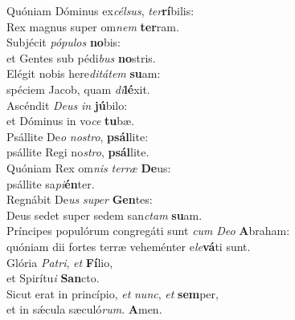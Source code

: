 \evenverse Quóniam Dóminus ex\textit{cél}\textit{sus}, \textit{ter}\textbf{rí}bilis:~\*\\
\evenverse Rex magnus super om\textit{nem} \textbf{ter}ram.\\
\oddverse Subjécit \textit{pó}\textit{pu}\textit{los} \textbf{no}bis:~\*\\
\oddverse et Gentes sub pédi\textit{bus} \textbf{no}stris.\\
\evenverse Elégit nobis here\textit{di}\textit{tá}\textit{tem} \textbf{su}am:~\*\\
\evenverse spéciem Jacob, quam \textit{di}\textbf{lé}xit.\\
\oddverse Ascéndit \textit{De}\textit{us} \textit{in} \textbf{jú}bilo:~\*\\
\oddverse et Dóminus in vo\textit{ce} \textbf{tu}bæ.\\
\evenverse Psállite De\textit{o} \textit{no}\textit{stro}, \textbf{psál}lite:~\*\\
\evenverse psállite Regi no\textit{stro}, \textbf{psál}lite.\\
\oddverse Quóniam Rex om\textit{nis} \textit{ter}\textit{ræ} \textbf{De}us:~\*\\
\oddverse psállite sa\textit{pi}\textbf{én}ter.\\
\evenverse Regnábit De\textit{us} \textit{su}\textit{per} \textbf{Gen}tes:~\*\\
\evenverse Deus sedet super sedem san\textit{ctam} \textbf{su}am.\\
\oddverse Príncipes populórum congregáti sunt \textit{cum} \textit{De}\textit{o} \textbf{A}braham:~\*\\
\oddverse quóniam dii fortes terræ veheménter e\textit{le}\textbf{vá}ti sunt.\\
\evenverse Glória \textit{Pa}\textit{tri}, \textit{et} \textbf{Fí}lio,~\*\\
\evenverse et Spirítu\textit{i} \textbf{San}cto.\\
\oddverse Sicut erat in princípio, \textit{et} \textit{nunc}, \textit{et} \textbf{sem}per,~\*\\
\oddverse et in sǽcula sæculó\textit{rum}. \textbf{A}men.\\
